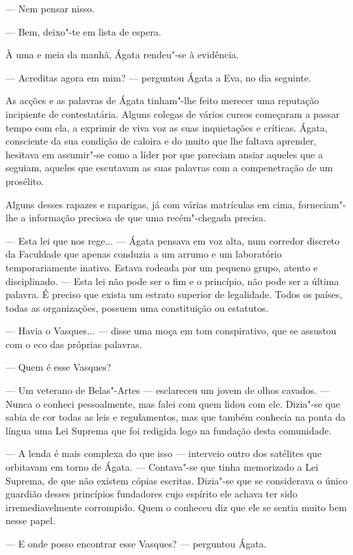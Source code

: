 --- Nem pensar nisso.

--- Bem, deixo"-te em lista de espera.

À uma e meia da manhã, Ágata rendeu"-se à evidência.

--- Acreditas agora em mim? --- perguntou Ágata a Eva, no dia seguinte.

As acções e as palavras de Ágata tinham"-lhe feito merecer uma reputação
incipiente de contestatária. Alguns colegas de vários cursos começaram a
passar tempo com ela, a exprimir de viva voz as suas inquietações e
críticas. Ágata, consciente da sua condição de caloira e do muito que
lhe faltava aprender, hesitava em assumir"-se como a líder por que pareciam ansiar aqueles que
a seguiam, aqueles que escutavam as suas palavras com a compenetração de
um prosélito.

Alguns desses rapazes e raparigas, já com várias matrículas em cima,
forneciam"-lhe a informação preciosa de que uma recém"-chegada precisa.

--- Esta lei que nos rege... --- Ágata pensava em voz alta, num corredor
discreto da Faculdade que apenas conduzia a um arrumo e um laboratório
temporariamente inativo. Estava rodeada por um pequeno grupo, atento e
disciplinado. --- Esta lei não pode ser o fim e o princípio, não pode ser a última
palavra. É preciso que exista um estrato superior de legalidade. Todos
os países, todas as organizações, possuem uma constituição ou
estatutos.

--- Havia o Vasques... --- disse uma moça em tom conspirativo, que se
assustou com o eco das próprias palavras.

--- Quem é esse Vasques?

--- Um veterano de Belas"-Artes --- esclareceu um jovem de olhos cavados.
--- Nunca o conheci pessoalmente, mas falei com quem lidou com ele.
Dizia"-se que sabia de cor todas as leis e regulamentos, mas que
também conhecia na ponta da língua uma Lei Suprema que foi redigida
logo na fundação desta comunidade.

--- A lenda é mais complexa do que isso --- interveio outro dos
satélites que orbitavam em torno de Ágata. --- Contava"-se que tinha
memorizado a Lei Suprema, de que não existem cópias escritas.
Dizia"-se que se considerava o único guardião desses princípios
fundadores cujo espírito ele achava ter sido irremediavelmente
corrompido. Quem o conheceu diz que ele se sentia muito bem nesse
papel.

--- E onde posso encontrar esse Vasques? --- perguntou Ágata.

